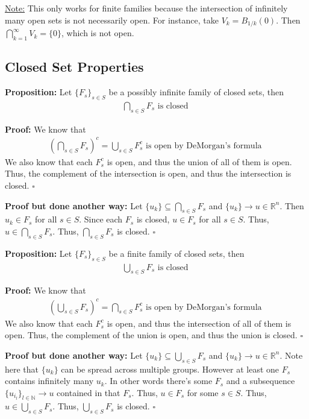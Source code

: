 \documentclass{article}
\newcommand*{\qed}{\hfill$\square$}%
\newcommand*{\txt}[1]{\text{ #1 }}%
\newcommand*{\rr}{\mathbb{R}}%
\begin{document}
\underline{Note:} This only works for finite families because the intersection of infinitely many open sets is not necessarily open. For instance, take $V_k=B_{1/k}(0)$. Then $\bigcap_{k=1}^\infty V_k=\{0\}$, which is not open. 

\subsection{Closed Set Properties}

\textbf{Proposition:} Let $\{F_s\}_{s\in S}$ be a possibly infinite family of closed sets, then \begin{align*}
    \bigcap_{s\in S}F_s\txt{ is closed}
\end{align*}

\textbf{Proof:} We know that \begin{align*}
    (\bigcap_{s\in S}F_s)^c=\bigcup_{s\in S}F_s^c\txt{ is open by DeMorgan's formula}
\end{align*}
We also know that each $F_s^c$ is open, and thus the union of all of them is open. Thus, the complement of the intersection is open, and thus the intersection is closed. \qed

\textbf{Proof but done another way:} Let $\{u_k\}\subseteq \bigcap_{s\in S}F_s$ and $\{u_k\}\to u\in \rr^n$. Then $u_k\in F_s$ for all $s\in S$. Since each $F_s$ is closed, $u\in F_s$ for all $s\in S$. Thus, $u\in \bigcap_{s\in S}F_s$. Thus, $\bigcap_{s\in S}F_s$ is closed. \qed

\textbf{Proposition:} Let $\{F_s\}_{s\in S}$ be a finite family of closed sets, then \begin{align*}
    \bigcup_{s\in S}F_s\txt{ is closed}
\end{align*}

\textbf{Proof:} We know that \begin{align*}
    (\bigcup_{s\in S}F_s)^c=\bigcap_{s\in S}F_s^c\txt{ is open by DeMorgan's formula}
\end{align*}
We also know that each $F_s^c$ is open, and thus the intersection of all of them is open. Thus, the complement of the union is open, and thus the union is closed. \qed

\textbf{Proof but done another way:} Let $\{u_k\}\subseteq \bigcup_{s\in S}F_s$ and $\{u_k\}\to u\in \rr^n$. Note here that $\{u_k\}$ can be spread across multiple groups. However at least one $F_s$ contains infinitely many $u_k$. In other words there's some $F_s$ and a subsequence $\{u_{i_l}\}_{l\in \mathbb{N}}\to u$ contained in that $F_s$. Thus, $u\in F_s$ for some $s\in S$. Thus, $u\in \bigcup_{s\in S}F_s$. Thus, $\bigcup_{s\in S}F_s$ is closed. \qed
\end{document}

